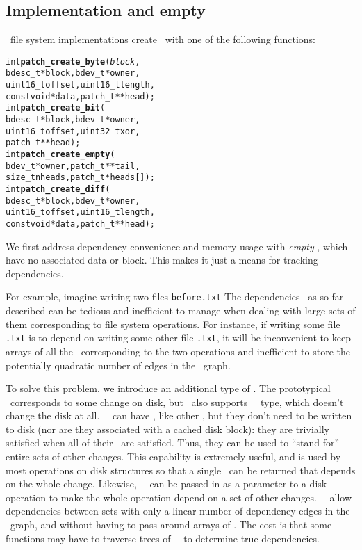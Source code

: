 
\subsection{Implementation and empty \patches}
\label{sec:chdescs:noop}

\Kudos\ file system implementations create \patches\ with one of the
following functions:

\begin{scriptsize}
\begin{alltt}
int \textbf{patch_create_byte}(\textit{block},
    bdesc_t *block, bdev_t *owner,
    uint16_t offset, uint16_t length,
    const void *data, patch_t **head);
int \textbf{patch_create_bit}(
    bdesc_t *block, bdev_t *owner,
    uint16_t offset, uint32_t xor,
    patch_t **head);
int \textbf{patch_create_empty}(
    bdev_t *owner, patch_t **tail,
    size_t nheads, patch_t * heads[]);
int \textbf{patch_create_diff}(
    bdesc_t *block, bdev_t *owner,
    uint16_t offset, uint16_t length,
    const void *data, patch_t **head);
\end{alltt}
\end{scriptsize}


We first address dependency convenience and memory usage with \emph{empty
\patches}, which have no associated data or block.
%
This makes it just a means for tracking dependencies.


For example, imagine writing two files \texttt{before.txt}
The dependencies 
\Chdescs\ as so far described can be tedious and inefficient to manage when
dealing with large sets of them corresponding to file system operations. For
instance, if writing some file \texttt{\after.txt} is to depend on writing some
other file \texttt{\before.txt}, it will be inconvenient to keep arrays of all
the \chdescs\ corresponding to the two operations and inefficient to store the
potentially quadratic number of edges in the \chdesc\ graph.

To solve this problem, we introduce an additional type of \chdesc. The
prototypical \chdesc\ corresponds to some change on disk, but \Kudos\ also
supports \aemphnoop\ \chdesc\ type, which doesn't change the disk at all.
\Noop\ \chdescs\ can have \befores, like other \chdescs, but they don't need to
be written to disk (nor are they associated with a cached disk block): they are
trivially satisfied when all of their \befores\ are satisfied. Thus, they can be
used to ``stand for'' entire sets of other changes.
%
This capability is extremely useful, and is used by most operations on disk
structures so that a single \chdesc\ can be returned that depends on the whole
change. Likewise, \anoop\ \chdesc\ can be passed in as a parameter to a disk
operation to make the whole operation depend on a set of other changes. \Noop\
\chdescs\ allow dependencies between sets with only a linear number of
dependency edges in the \chdesc\ graph, and without having to pass around arrays
of \chdescs.
%
The cost is that some functions may have to traverse trees of \noop\ \chdescs\
to determine true dependencies.

